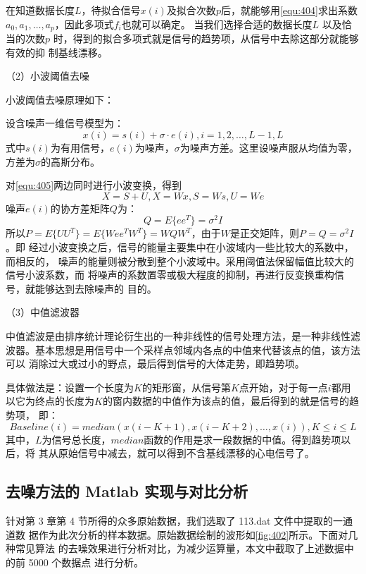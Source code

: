 在知道数据长度$L$，待拟合信号$x(i)$及拟合次数$p$后，就能够用\autoref{equ:404}求出系数$a_0,a_1,\dots,a_p$，因此多项式$f_i$也就可以确定\cite{16}。
当我们选择合适的数据长度$L$ 以及恰当的次数$p$ 时，得到的拟合多项式就是信号的趋势项，从信号中去除这部分就能够有效的抑
制基线漂移。

（2）小波阈值去噪

小波阈值去噪原理如下\cite{17,18}：

设含噪声一维信号模型为：
\begin{equation}
    \label{equ:405}
    x(i)=s(i) + \sigma \cdot e(i), i= 1, 2,\dots,L-1,L
\end{equation}
式中$s(i)$为有用信号，$e(i)$为噪声，$\sigma$为噪声方差。这里设噪声服从均值为零，方差为$\sigma$的高斯分布。

对\autoref{equ:405}两边同时进行小波变换，得到
\begin{equation}
    \label{equ:406}
    X=S+U, X=Wx, S=Ws,U=We
\end{equation}
噪声$e(i)$的协方差矩阵$Q$为：
\begin{equation}
    \label{equ:407}
    Q=E\{ee^T\}=\sigma^2I
\end{equation}
所以$P=E\{UU^T\}=E\{Wee^TW^T\}=WQW^T$，由于$W$是正交矩阵，则$P=Q=\sigma^2I$。即
经过小波变换之后，信号的能量主要集中在小波域内一些比较大的系数中，而相反的，
噪声的能量则被分散到整个小波域中。采用阈值法保留幅值比较大的信号小波系数，而
将噪声的系数置零或极大程度的抑制，再进行反变换重构信号，就能够达到去除噪声的
目的。

（3）中值滤波器

中值滤波是由排序统计理论衍生出的一种非线性的信号处理方法，是一种非线性滤
波器。基本思想是用信号中一个采样点邻域内各点的中值来代替该点的值，该方法可以
消除过大或过小的野点，最后得到信号的大体走势，即趋势项\cite{19}。

具体做法是：设置一个长度为$K$的矩形窗，从信号第$K$点开始，对于每一点$i$都用
以它为终点的长度为$K$的窗内数据的中值作为该点的值，最后得到的就是信号的趋势项，
即：
\begin{equation}
    \label{equ:408}
    Baseline(i)=median(x(i-K+1),x(i-K+2),\dots,x(i)),K\le i \le L
\end{equation}
其中，$L$为信号总长度，$median$函数的作用是求一段数据的中值。得到趋势项以后，将
其从原始信号中减去，就可以得到不含基线漂移的心电信号了。

\subsection{去噪方法的 Matlab 实现与对比分析}
针对第 3 章第 4 节所得的众多原始数据，我们选取了 113.dat 文件中提取的一通道数
据作为此次分析的样本数据。原始数据绘制的波形如\autoref{fig:402}所示。下面对几种常见算法
的去噪效果进行分析对比，为减少运算量，本文中截取了上述数据中的前 5000 个数据点
进行分析。

